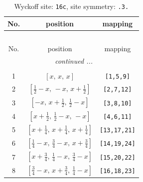 \documentclass[fleqn,8pt]{jsarticle}
\begin{document}
\begin{longtable}{ccc}
\caption{Wyckoff site: {\tt 16c}, site symmetry: {\tt .3.}}
 \\
 \hline \hline
No. & position & mapping \\ \hline \endfirsthead

\multicolumn{2}{l}{\tablename\ \thetable{}} \\
 \hline \hline
No. & position & mapping \\ \hline \endhead

 \hline \hline
\multicolumn{2}{r}{\footnotesize\it continued ...} \\ \endfoot

 \hline \hline
\multicolumn{2}{r}{} \\ \endlastfoot

1 & $\left[ x,\, x,\, x \right]$ & {\tt [1,5,9]} \\ \hline
2 & $\left[ \frac{1}{2} - x,\, - x,\, x + \frac{1}{2} \right]$ & {\tt [2,7,12]} \\ \hline
3 & $\left[ - x,\, x + \frac{1}{2},\, \frac{1}{2} - x \right]$ & {\tt [3,8,10]} \\ \hline
4 & $\left[ x + \frac{1}{2},\, \frac{1}{2} - x,\, - x \right]$ & {\tt [4,6,11]} \\ \hline
5 & $\left[ x + \frac{1}{4},\, x + \frac{1}{4},\, x + \frac{1}{4} \right]$ & {\tt [13,17,21]} \\ \hline
6 & $\left[ \frac{1}{4} - x,\, \frac{3}{4} - x,\, x + \frac{3}{4} \right]$ & {\tt [14,19,24]} \\ \hline
7 & $\left[ x + \frac{3}{4},\, \frac{1}{4} - x,\, \frac{3}{4} - x \right]$ & {\tt [15,20,22]} \\ \hline
8 & $\left[ \frac{3}{4} - x,\, x + \frac{3}{4},\, \frac{1}{4} - x \right]$ & {\tt [16,18,23]} \\
\end{longtable}
\renewcommand{\arraystretch}{1.2}
\end{document}
